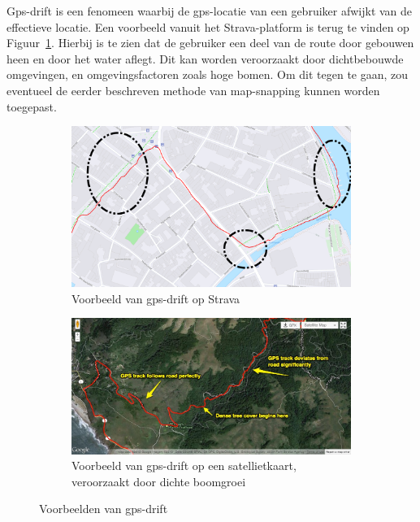 Gps-drift is een fenomeen waarbij de \ac{gps}-locatie van een gebruiker afwijkt
van de effectieve locatie. Een voorbeeld vanuit het Strava-platform is terug te
vinden op Figuur~\ref{fig:gps_drift_Strava}. Hierbij is te zien dat de
gebruiker een deel van de route door gebouwen heen en door het water aflegt.
Dit kan worden veroorzaakt door dichtbebouwde omgevingen, en omgevingsfactoren
zoals hoge bomen. Om dit tegen te gaan, zou eventueel de eerder beschreven
methode van map-snapping kunnen worden toegepast.
\begin{figure}[h]
    \centering
    \begin{subfigure}[b]{.45\textwidth}
        \centering
        \includegraphics[width=\textwidth]{fig/Afwijkingen&Analyses/Crooked Routes/GPS-drift.png}
        \caption{Voorbeeld van gps-drift op Strava}\label{fig:gps_drift_Strava}
    \end{subfigure}\hfill
    \begin{subfigure}[b]{.49\textwidth}
        \centering
        \includegraphics[width=\textwidth]{fig/Afwijkingen&Analyses/Crooked Routes/GPS-Drift_onlnie.jpg}
        \caption{Voorbeeld van gps-drift op een satellietkaart, veroorzaakt door dichte boomgroei~\cite{BadGPSDa19:online}}
    \end{subfigure}
    \caption{Voorbeelden van gps-drift}
\end{figure}

